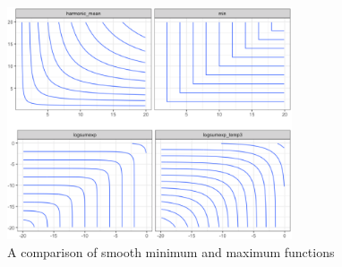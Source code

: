 \begin{figure}[th!]
\caption{A comparison of smooth minimum and maximum functions}
\label{figure:softmax}
\begin{centering}

\includegraphics[width=0.75\textwidth]{softmax.png} 
\end{centering}


\end{figure}


